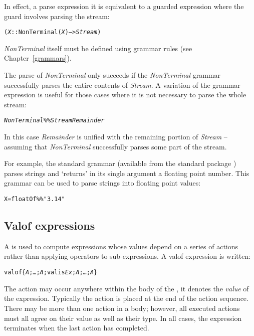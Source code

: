 In effect, a parse expression it is equivalent to a guarded expression where the guard involves parsing the stream:
\begin{alltt}
(\emph{X} :: NonTerminal(\emph{X}) --> \emph{Stream})
\end{alltt}
\emph{NonTerminal} itself must be defined using grammar rules (see Chapter~\vref{grammars}).

The parse of \emph{NonTerminal} only succeeds if the \emph{NonTerminal} grammar successfully parses the entire contents of \emph{Stream}. A variation of the grammar expression is useful for those cases where it is not necessary to parse the whole stream:
\begin{alltt}
\emph{NonTerminal} \%\% \emph{Stream} \tilda\emph{Remainder}
\end{alltt}
In this case \emph{Remainder} is unified with the remaining portion of \emph{Stream} -- assuming that \emph{NonTerminal} successfully parses some part of the stream.

For example, the standard  grammar (available from the standard package ) parses strings and `returns' in its single argument a floating point number. This grammar can be used to parse strings into floating point values:
\begin{alltt}
X = floatOf\%\%"3.14"
\end{alltt}

\subsection{Valof expressions}
\label{expression:valof}
A  is used to compute expressions whose values depend on a series of actions rather than applying operators to sub-expressions. A valof expression is written:
\begin{alltt}
valof\{ \emph{A};\ldots;\emph{A};valis \emph{Ex};\emph{A};\ldots;\emph{A\subn}\}
\end{alltt}
The  action may occur anywhere within the body of the , it denotes the \emph{value} of the  expression. Typically the  action is placed at the end of the action sequence. There may be more than one  action in a  body; however, all executed  actions must all agree on their value as well as their type. In all cases, the  expression terminates when the last action has completed.


